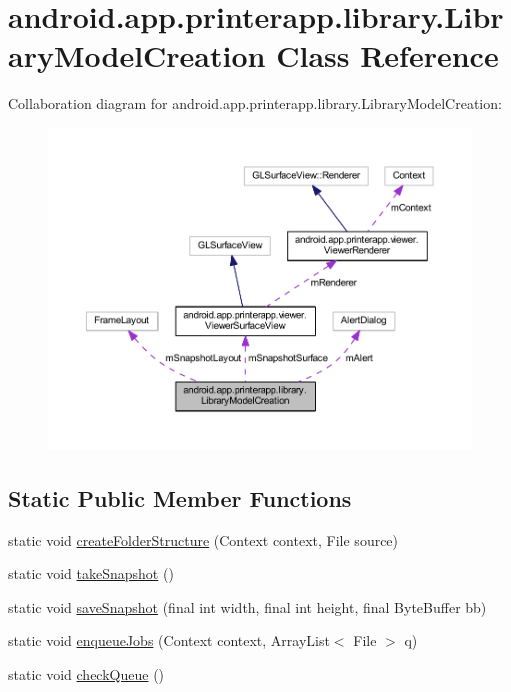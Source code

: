 \hypertarget{classandroid_1_1app_1_1printerapp_1_1library_1_1_library_model_creation}{}\section{android.\+app.\+printerapp.\+library.\+Library\+Model\+Creation Class Reference}
\label{classandroid_1_1app_1_1printerapp_1_1library_1_1_library_model_creation}


Collaboration diagram for android.\+app.\+printerapp.\+library.\+Library\+Model\+Creation\+:
\nopagebreak
\begin{figure}[H]
\begin{center}
\leavevmode
\includegraphics[width=350pt]{classandroid_1_1app_1_1printerapp_1_1library_1_1_library_model_creation__coll__graph}
\end{center}
\end{figure}
\subsection*{Static Public Member Functions}
\begin{DoxyCompactItemize}
\item 
static void \hyperlink{classandroid_1_1app_1_1printerapp_1_1library_1_1_library_model_creation_ab868798b71e069b616f5658a19faca53}{create\+Folder\+Structure} (Context context, File source)
\item 
static void \hyperlink{classandroid_1_1app_1_1printerapp_1_1library_1_1_library_model_creation_ae1f951cdfa755b64f7ab95a6f7440046}{take\+Snapshot} ()
\item 
static void \hyperlink{classandroid_1_1app_1_1printerapp_1_1library_1_1_library_model_creation_afe1a5424a21b4b4c28e2cc5f0f13732a}{save\+Snapshot} (final int width, final int height, final Byte\+Buffer bb)
\item 
static void \hyperlink{classandroid_1_1app_1_1printerapp_1_1library_1_1_library_model_creation_aba1c0c05fad812eee81cba182b26307e}{enqueue\+Jobs} (Context context, Array\+List$<$ File $>$ q)
\item 
static void \hyperlink{classandroid_1_1app_1_1printerapp_1_1library_1_1_library_model_creation_a38c6b617ca73837f38cbd9f36f0124e2}{check\+Queue} ()
\end{DoxyCompactItemize}
